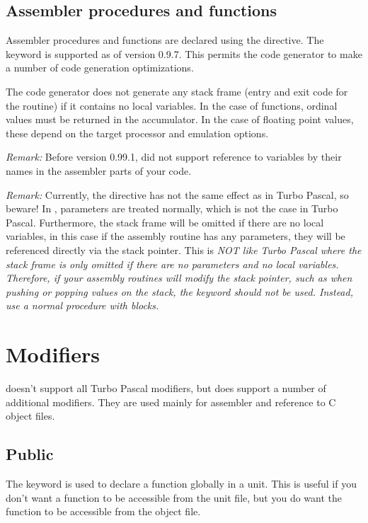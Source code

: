 \documentclass{report}
\begin{document}
\subsection{ Assembler procedures and functions }

Assembler procedures and functions are declared using the
 directive. The  keyword is supported
as of version 0.9.7. This permits the code generator to make a number
of code generation optimizations.

The code generator does not generate any stack frame (entry and exit
code for the routine) if it contains no local variables. In the case
of functions, ordinal values must be returned in the accumulator. In
the case of floating point values, these depend on the target processor
and emulation options.

\emph{ Remark: } Before version 0.99.1, \fpc did not support
reference to variables by their names in the assembler parts of your code.

\emph{ Remark: } Currently, the  directive has not the
same effect as in Turbo Pascal, so beware! In \fpc, parameters are
treated normally, which is not the case in Turbo Pascal. Furthermore,
the stack frame will be omitted if there are no local variables, in this
case if the assembly routine has any parameters, they will be referenced
directly via the stack pointer. This is \em{ NOT} like Turbo Pascal where
the stack frame is only omitted if there are no parameters \em{ and } no
local variables. Therefore, if your assembly routines will modify the stack
pointer, such as when pushing or popping values on the stack, the
 keyword should not be used. Instead, use a normal procedure
with  blocks.

\section{Modifiers}
\fpc doesn't support all Turbo Pascal modifiers, but
does support a number of additional modifiers. They are used mainly for assembler and
reference to C object files.

\subsection{Public}
The  keyword is used to declare a function globally in a unit.
This is useful if you don't want a function to be accessible from the unit
file, but you do want the function to be accessible from the object file.
\end{document}
